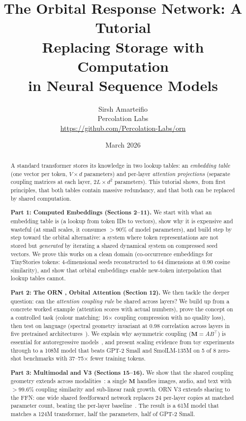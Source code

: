 \documentclass[11pt, a4paper]{article}
\title{%
    \textbf{The Orbital Response Network: A Tutorial}\\[4pt]
    \Large Replacing Storage with Computation\\
    in Neural Sequence Models%
}
\author{%
    Sirsh Amarteifio\\
    {\small Percolation Labs}\\
    {\small \url{https://github.com/Percolation-Labs/orn}}%
}
\date{March 2026 \quad{\small\textnormal{,  Tutorial Document}}}
\newcommand{\M}{\mathbf{M}}
\theoremstyle{remark}
\begin{document}
\maketitle

\begin{abstract}
A standard transformer stores its knowledge in two lookup tables: an \emph{embedding table} (one vector per token, $V \times d$ parameters) and per-layer \emph{attention projections} (separate coupling matrices at each layer, $2L \times d^2$ parameters).
This tutorial shows, from first principles, that both tables contain massive redundancy, and that both can be replaced by shared computation.

\textbf{Part 1: Computed Embeddings (Sections 2--11).}
We start with what an embedding table is (a lookup from token IDs to vectors), show why it is expensive and wasteful (at small scales, it consumes $>$90\% of model parameters), and build step by step toward the orbital alternative: a system where token representations are not stored but \emph{generated} by iterating a shared dynamical system on compressed seed vectors.
We prove this works on a clean domain (co-occurrence embeddings for TinyStories tokens: 4-dimensional seeds reconstructed to 64 dimensions at 0.90 cosine similarity), and show that orbital embeddings enable new-token interpolation that lookup tables cannot.

\textbf{Part 2: The ORN ,  Orbital Attention (Section 12).}
We then tackle the deeper question: can the \emph{attention coupling rule} be shared across layers?
We build up from a concrete worked example (attention scores with actual numbers), prove the concept on a controlled task (colour matching: 16$\times$ coupling compression with no quality loss), then test on language (spectral geometry invariant at 0.98 correlation across layers in five pretrained architectures~\cite{masa2025}).
We explain why asymmetric coupling ($\M = AB^\top$) is essential for autoregressive models~\cite{altabaa2024dat}, and present scaling evidence from toy experiments through to a 108M model that beats GPT-2 Small and SmolLM-135M on 5 of 8 zero-shot benchmarks with 37--75$\times$ fewer training tokens.

\textbf{Part 3: Multimodal and V3 (Sections 15--16).}
We show that the shared coupling geometry extends across modalities~\cite{huh2024platonic}: a single $\M$ handles images, audio, and text with $>99.6\%$ coupling similarity and sub-linear rank growth.
ORN V3 extends sharing to the FFN: one wide shared feedforward network replaces 24 per-layer copies at matched parameter count, beating the per-layer baseline~\cite{onewideffn2023}.
The result is a 61M model that matches a 124M transformer, half the parameters, half of GPT-2 Small.


\end{abstract}
\end{document}
